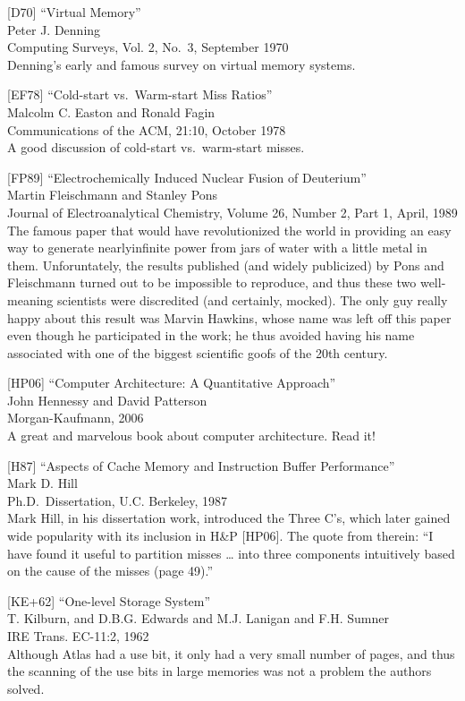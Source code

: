 {[}D70{]} ``Virtual Memory''\\
Peter J. Denning\\
Computing Surveys, Vol. 2, No.~3, September 1970\\
Denning's early and famous survey on virtual memory systems.

{[}EF78{]} ``Cold-start vs.~Warm-start Miss Ratios''\\
Malcolm C. Easton and Ronald Fagin\\
Communications of the ACM, 21:10, October 1978\\
A good discussion of cold-start vs.~warm-start misses.

{[}FP89{]} ``Electrochemically Induced Nuclear Fusion of Deuterium''\\
Martin Fleischmann and Stanley Pons\\
Journal of Electroanalytical Chemistry, Volume 26, Number 2, Part 1,
April, 1989\\
The famous paper that would have revolutionized the world in providing
an easy way to generate nearlyinfinite power from jars of water with a
little metal in them. Unforuntately, the results published (and widely
publicized) by Pons and Fleischmann turned out to be impossible to
reproduce, and thus these two well-meaning scientists were discredited
(and certainly, mocked). The only guy really happy about this result was
Marvin Hawkins, whose name was left off this paper even though he
participated in the work; he thus avoided having his name associated
with one of the biggest scientific goofs of the 20th century.

{[}HP06{]} ``Computer Architecture: A Quantitative Approach''\\
John Hennessy and David Patterson\\
Morgan-Kaufmann, 2006\\
A great and marvelous book about computer architecture. Read it!

{[}H87{]} ``Aspects of Cache Memory and Instruction Buffer
Performance''\\
Mark D. Hill\\
Ph.D.~Dissertation, U.C. Berkeley, 1987\\
Mark Hill, in his dissertation work, introduced the Three C's, which
later gained wide popularity with its inclusion in H\&P {[}HP06{]}. The
quote from therein: ``I have found it useful to partition misses
\ldots{} into three components intuitively based on the cause of the
misses (page 49).''

{[}KE+62{]} ``One-level Storage System''\\
T. Kilburn, and D.B.G. Edwards and M.J. Lanigan and F.H. Sumner\\
IRE Trans. EC-11:2, 1962\\
Although Atlas had a use bit, it only had a very small number of pages,
and thus the scanning of the use bits in large memories was not a
problem the authors solved.

